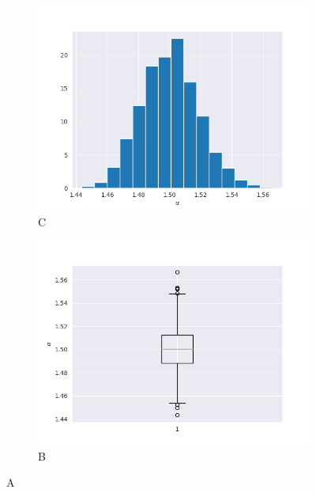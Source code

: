 \documentclass{article}
\begin{document}
		\begin{figure}[H]
			\begin{subfigure}{.5\textwidth}
				\centering
				\includegraphics[width=1\linewidth]{images/cf_alpha_hist.png}
				\caption{C}
			\end{subfigure}
			\begin{subfigure}[r]{.5\textwidth}
				\centering
				\includegraphics[width=1\linewidth]{images/cf_alpha_boxplot.png}
				\caption{B}\label{alpha1}
			\end{subfigure}
			\caption{A}
		\end{figure}
		
\end{document}
